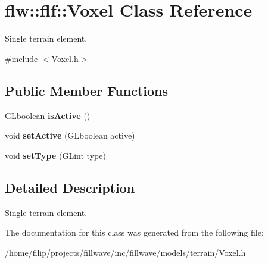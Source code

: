 \hypertarget{classflw_1_1flf_1_1Voxel}{}\section{flw\+:\+:flf\+:\+:Voxel Class Reference}
\label{classflw_1_1flf_1_1Voxel}


Single terrain element.  




{\ttfamily \#include $<$Voxel.\+h$>$}

\subsection*{Public Member Functions}
\begin{DoxyCompactItemize}
\item 
\mbox{\label{classflw_1_1flf_1_1Voxel_ac4066a31aee514f2045affc6456b9f06}} 
G\+Lboolean {\bfseries is\+Active} ()
\item 
\mbox{\label{classflw_1_1flf_1_1Voxel_a2ac5955ffd95984c466096334e4072b1}} 
void {\bfseries set\+Active} (G\+Lboolean active)
\item 
\mbox{\label{classflw_1_1flf_1_1Voxel_a4dc2cac166662f44dc4ced9170f20a8c}} 
void {\bfseries set\+Type} (G\+Lint type)
\end{DoxyCompactItemize}


\subsection{Detailed Description}
Single terrain element. 

The documentation for this class was generated from the following file\+:\begin{DoxyCompactItemize}
\item 
/home/filip/projects/fillwave/inc/fillwave/models/terrain/Voxel.\+h\end{DoxyCompactItemize}
